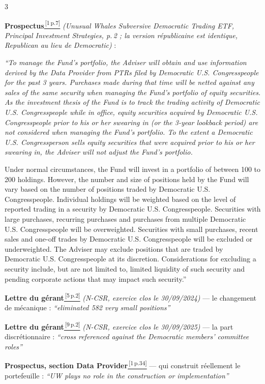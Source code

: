 \documentclass[9pt,a4paper]{extarticle}
\newcommand{\rf}[3]{\href{docs_nanc_gop/#2\#page=#3}{\color{bleu}\textsuperscript{\,[#1\,p.#3]}}}
\newcommand{\sPro}[1]{\rf{1}{1-prospectus-statutaire-SAI-20260127.pdf}{#1}}
\newcommand{\sAquatre}[1]{\rf{5}{5-rapport-annuel-FY2024.pdf}{#1}}
\newcommand{\sAcinq}[1]{\rf{9}{9-rapport-annuel-FY2025.pdf}{#1}}
\begin{document}
\begin{multicols}{3}\raggedright\sloppy
{\footnotesize\textbf{Prospectus}\sPro{7} \emph{(\og{}Unusual Whales Subversive Democratic Trading ETF\fg{}, \og{}Principal Investment Strategies\fg{}, p.\,2 ; la version républicaine est identique, \og{}Republican\fg{} au lieu de \og{}Democratic\fg{})} :\par}
{\scriptsize\itshape
``To manage the Fund's portfolio, the Adviser will obtain and use information derived by the Data Provider from PTRs filed by Democratic U.S. Congresspeople for the past 3 years. Purchases made during that time will be netted against any sales of the same security when managing the Fund's portfolio of equity securities. As the investment thesis of the Fund is to track the trading activity of Democratic U.S. Congresspeople while in office, equity securities acquired by Democratic U.S. Congresspeople prior to his or her swearing in (or the 3-year lookback period) are not considered when managing the Fund's portfolio. To the extent a Democratic U.S. Congressperson sells equity securities that were acquired prior to his or her swearing in, the Adviser will not adjust the Fund's portfolio.

Under normal circumstances, the Fund will invest in a portfolio of between 100 to 200 holdings. However, the number and size of positions held by the Fund will vary based on the number of positions traded by Democratic U.S. Congresspeople. Individual holdings will be weighted based on the level of reported trading in a security by Democratic U.S. Congresspeople. Securities with large purchases, recurring purchases and purchases from multiple Democratic U.S. Congresspeople will be overweighted. Securities with small purchases, recent sales and one-off trades by Democratic U.S. Congresspeople will be excluded or underweighted. The Adviser may exclude positions that are traded by Democratic U.S. Congresspeople at its discretion. Considerations for excluding a security include, but are not limited to, limited liquidity of such security and pending corporate actions that may impact such security.''\par}
\vspace{1.2mm}
{\footnotesize\textbf{Lettre du gérant}\sAquatre{2} \emph{(N-CSR, exercice clos le 30/09/2024)} --- le changement de mécanique : {\itshape ``eliminated 582 very small positions''}\par
\vspace{0.8mm}
\textbf{Lettre du gérant}\sAcinq{2} \emph{(N-CSR, exercice clos le 30/09/2025)} --- la part discrétionnaire : {\itshape ``cross referenced against the Democratic members' committee roles''}\par
\vspace{0.8mm}
\textbf{Prospectus, section \og{}Data Provider\fg{}}\sPro{34} --- qui construit réellement le portefeuille : {\itshape ``UW plays no role in the construction or implementation''}\par}
\end{multicols}
\end{document}
